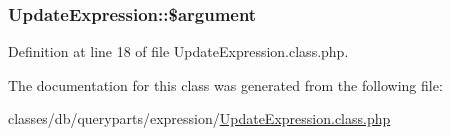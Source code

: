 \subsubsection[{\$argument}]{\setlength{\rightskip}{0pt plus 5cm}Update\+Expression\+::\$argument}\label{classUpdateExpression_a5ad6b27dd8458bfdd8317006ec1c5983}


Definition at line 18 of file Update\+Expression.\+class.\+php.



The documentation for this class was generated from the following file\+:\begin{DoxyCompactItemize}
\item 
classes/db/queryparts/expression/\hyperlink{UpdateExpression_8class_8php}{Update\+Expression.\+class.\+php}\end{DoxyCompactItemize}
